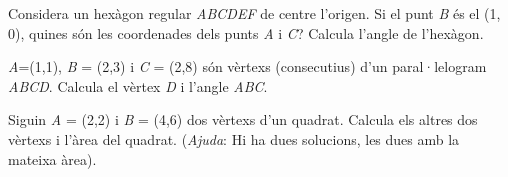 \begin{activitats}
\begin{mylist}
	 
	 \exer  Considera un hexàgon regular \textit{ABCDEF} de centre l'origen. Si el punt \textit{B} és el (1, 0), quines són les coordenades dels punts \textit{A}  i \textit{C}?  Calcula l'angle de l'hexàgon. 
	 
	 
	 \exer  \textit{A}=(1,1), \textit{B} = (2,3) i \textit{C} = (2,8) són vèrtexs (consecutius) d'un paral·lelogram \textit{ABCD}. Calcula el vèrtex \textit{D} i l'angle \textit{ABC}.
	  
	   
	 \exer  Siguin  \textit{A} = (2,2) i \textit{B} = (4,6) dos vèrtexs d'un quadrat. Calcula els altres dos vèrtexs i l'àrea del quadrat. (\textit{Ajuda}: Hi ha dues solucions, les dues amb la mateixa àrea).
	 \label{problema:quadrat8}
	 
	 

\end{mylist}
\end{activitats}
